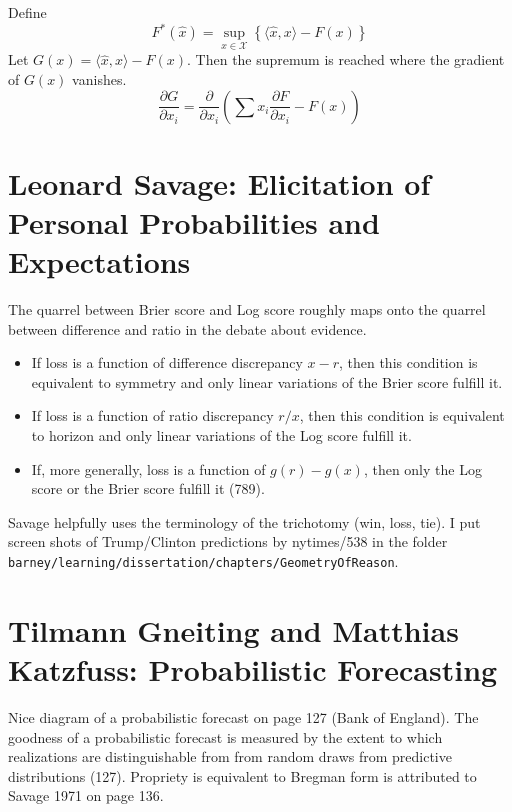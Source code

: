 \documentclass[12pt]{article}
\begin{document}
Define
\begin{equation}
  \label{eq:kiegiqui}
  F^{\ast}(\hat{x})=\sup_{x\in\mathcal{X}}\left\{\langle{}\hat{x},x\rangle{}-F(x)\right\}
\end{equation}
Let $G(x)=\langle{}\hat{x},x\rangle{}-F(x)$. Then the supremum is
reached where the gradient of $G(x)$ vanishes.
\begin{equation}
  \label{eq:ahkoobou}
  \frac{\partial{}G}{\partial{}x_{i}}=\frac{\partial}{\partial{}x_{i}}\left(\sum{}x_{i}\frac{\partial{}F}{\partial{}x_{i}}-F(x)\right)
\end{equation}


\section{Leonard Savage: Elicitation of Personal Probabilities and Expectations}
\label{section:euzaevoe}

The quarrel between Brier score and Log score roughly maps onto the
quarrel between difference and ratio in the debate about evidence.
\begin{itemize}
\item If loss is a function of difference discrepancy $x-r$, then this
  condition is equivalent to symmetry and only linear variations of
  the Brier score fulfill it.
\item If loss is a function of ratio discrepancy $r/x$, then this condition
  is equivalent to horizon and only linear variations of the Log
  score fulfill it.
\item If, more generally, loss is a function of $g(r)-g(x)$, then only
  the Log score or the Brier score fulfill it (789).
\end{itemize}
Savage helpfully uses the terminology of the trichotomy (win, loss,
tie). I put screen shots of Trump/Clinton predictions by nytimes/538
in the folder \texttt{barney/learning/dissertation/chapters/GeometryOfReason}.

\section{Tilmann Gneiting and Matthias Katzfuss: Probabilistic Forecasting}
\label{section:shaemabi}

Nice diagram of a probabilistic forecast on page 127 (Bank of
England). The goodness of a probabilistic forecast is measured by the
extent to which realizations are distinguishable from from random
draws from predictive distributions (127). Propriety is equivalent to
Bregman form is attributed to Savage 1971 on page 136.
\end{document}
